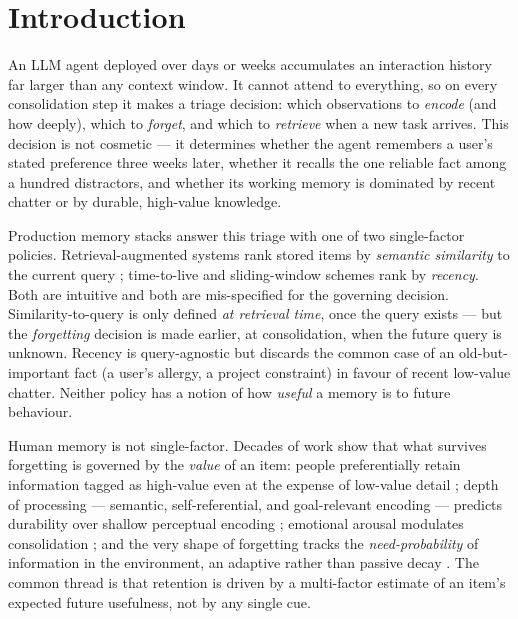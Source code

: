 \section{Introduction}
\label{sec:intro}

An LLM agent deployed over days or weeks accumulates an interaction
history far larger than any context window. It cannot attend to
everything, so on every consolidation step it makes a triage decision:
which observations to \emph{encode} (and how deeply), which to
\emph{forget}, and which to \emph{retrieve} when a new task arrives.
This decision is not cosmetic --- it determines whether the agent
remembers a user's stated preference three weeks later, whether it
recalls the one reliable fact among a hundred distractors, and whether
its working memory is dominated by recent chatter or by durable,
high-value knowledge.

Production memory stacks answer this triage with one of two
single-factor policies. Retrieval-augmented systems rank stored items by
\emph{semantic similarity} to the current query
\citep{lewis2020rag,packer2023memgpt}; time-to-live and sliding-window
schemes rank by \emph{recency}. Both are intuitive and both are
mis-specified for the governing decision. Similarity-to-query is only
defined \emph{at retrieval time}, once the query exists --- but the
\emph{forgetting} decision is made earlier, at consolidation, when the
future query is unknown. Recency is query-agnostic but discards the
common case of an old-but-important fact (a user's allergy, a project
constraint) in favour of recent low-value chatter. Neither policy has a
notion of how \emph{useful} a memory is to future behaviour.

Human memory is not single-factor. Decades of work show that what
survives forgetting is governed by the \emph{value} of an item:
people preferentially retain information tagged as high-value even at
the expense of low-value detail \citep{castel2008value}; depth of
processing --- semantic, self-referential, and goal-relevant encoding
--- predicts durability over shallow perceptual encoding
\citep{craik1972lop,rogers1977sre}; emotional arousal modulates
consolidation \citep{mcgaugh2000consolidation}; and the very shape of
forgetting tracks the \emph{need-probability} of information in the
environment, an adaptive rather than passive decay
\citep{anderson1991adaptive,ebbinghaus1885forgetting}. The common thread
is that retention is driven by a multi-factor estimate of an item's
expected future usefulness, not by any single cue.

